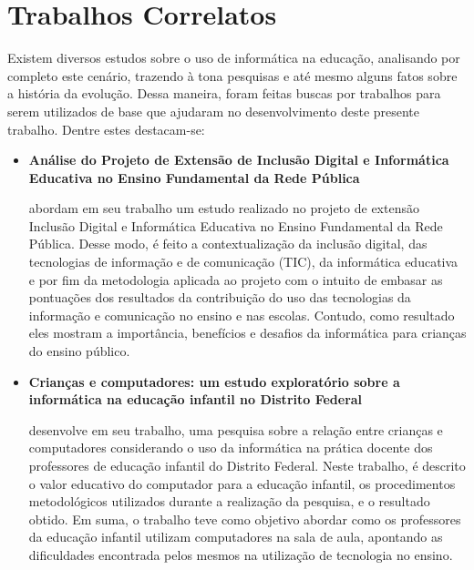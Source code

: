 \chapter{Trabalhos Correlatos}
\label{chap:trabalhosCorrelatos}

Existem diversos estudos sobre o uso de informática na educação, analisando por completo este cenário, trazendo à tona pesquisas e até mesmo alguns fatos sobre a história da evolução. Dessa maneira, foram feitas buscas por trabalhos para serem utilizados de base que ajudaram no desenvolvimento deste presente trabalho. Dentre estes destacam-se:

\begin{itemize}

\item \textbf{Análise do Projeto de Extensão de Inclusão Digital e Informática Educativa no Ensino Fundamental da Rede Pública}

 abordam em seu trabalho um estudo realizado no projeto de extensão Inclusão Digital e Informática Educativa no Ensino Fundamental da Rede Pública. Desse modo, é feito a contextualização da inclusão digital, das tecnologias de informação e de comunicação (TIC), da informática educativa e por fim da metodologia aplicada ao projeto com o intuito de embasar as pontuações dos resultados da contribuição do uso das tecnologias da informação e comunicação no ensino e nas escolas. Contudo, como resultado eles mostram a importância, benefícios e desafios da informática para crianças do ensino público.

\item \textbf{Crianças e computadores: um estudo exploratório sobre a informática na educação infantil no Distrito Federal}

 desenvolve em seu trabalho, uma pesquisa sobre a relação entre crianças e computadores considerando o uso da informática na prática docente dos professores de educação infantil do Distrito Federal. Neste trabalho, é descrito o valor educativo do computador para a educação infantil, os procedimentos metodológicos utilizados durante a realização da pesquisa, e o resultado obtido. Em suma, o trabalho teve como objetivo abordar como os professores da educação infantil utilizam computadores na sala de aula, apontando as dificuldades encontrada pelos mesmos na utilização de tecnologia no ensino.



\end{itemize}
